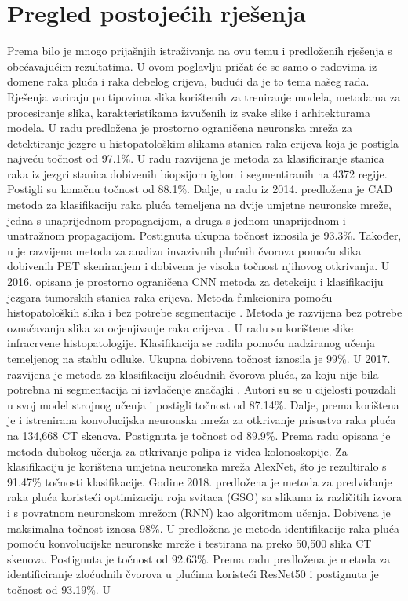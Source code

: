 \documentclass[conference, utf8]{IEEEtran}
\begin{document}
	\section{Pregled postojećih rješenja}
	Prema \cite{mehmood2022malignancy} bilo je mnogo prijašnjih istraživanja na ovu temu i predloženih rješenja s obećavajućim rezultatima. U ovom poglavlju pričat će se samo o radovima iz domene raka pluća i raka debelog crijeva, budući da je to tema našeg rada. Rješenja variraju po tipovima slika korištenih za treniranje modela, metodama za procesiranje slika, karakteristikama izvučenih iz svake slike i arhitekturama modela. U radu \cite{Sirinukunwattana} predložena je prostorno ograničena neuronska mreža za detektiranje jezgre u histopatološkim slikama stanica raka crijeva koja je postigla najveću točnost od 97.1\%. U radu \cite{Multimodal_sparse} razvijena je metoda za klasificiranje stanica raka iz jezgri stanica dobivenih biopsijom iglom i segmentiranih na 4372 regije. Postigli su konačnu točnost od 88.1\%. Dalje, u radu iz 2014.\cite{kuruvilla2014lung} predložena je CAD metoda za klasifikaciju raka pluća temeljena na dvije umjetne neuronske mreže, jedna s unaprijednom propagacijom, a druga s jednom unaprijednom i unatražnom propagacijom. Postignuta ukupna točnost iznosila je 93.3\%. Također, u \cite{deppen2014accuracy} je razvijena metoda za analizu invazivnih plućnih čvorova pomoću slika dobivenih PET skeniranjem i dobivena je visoka točnost njihovog otkrivanja. U 2016. opisana je prostorno ograničena CNN metoda za detekciju i klasifikaciju jezgara tumorskih stanica raka crijeva. Metoda funkcionira pomoću histopatoloških slika i bez potrebe segmentacije \cite{sirinukunwattana2016locality}. Metoda je razvijena bez potrebe označavanja slika za ocjenjivanje raka crijeva \cite{kuepper2016label}. U radu su korištene slike infracrvene histopatologije. Klasifikacija se radila pomoću nadziranog učenja temeljenog na stablu odluke. Ukupna dobivena točnost iznosila je 99\%. U 2017. razvijena je metoda za klasifikaciju zloćudnih čvorova pluća, za koju nije bila potrebna ni segmentacija ni izvlačenje značajki \cite{shen2017multi}. Autori su se u cijelosti pouzdali u svoj model strojnog učenja i postigli točnost od 87.14\%. Dalje, prema \cite{sun2017automatic} korištena je i istrenirana konvolucijska neuronska mreža za otkrivanje prisustva raka pluća na 134,668 CT skenova. Postignuta je točnost od 89.9\%. Prema radu \cite{yuan2017automatic} opisana je metoda dubokog učenja za otkrivanje polipa iz videa kolonoskopije. Za klasifikaciju je korištena umjetna neuronska mreža AlexNet, što je rezultiralo s 91.47\% točnosti klasifikacije. Godine 2018. predložena je metoda za predviđanje raka pluća \cite{selvanambi2020lung} koristeći optimizaciju roja svitaca (GSO) sa slikama iz različitih izvora i s povratnom neuronskom mrežom (RNN) kao algoritmom učenja. Dobivena je maksimalna točnost iznosa 98\%. U \cite{de2018classification} predložena je metoda identifikacije raka pluća pomoću konvolucijske neuronske mreže i testirana na preko 50,500 slika CT skenova. Postignuta je točnost od 92.63\%. Prema radu \cite{da2020lung} predložena je metoda za identificiranje zloćudnih čvorova u plućima koristeći ResNet50 i postignuta je točnost od 93.19\%. U 
\end{document}
